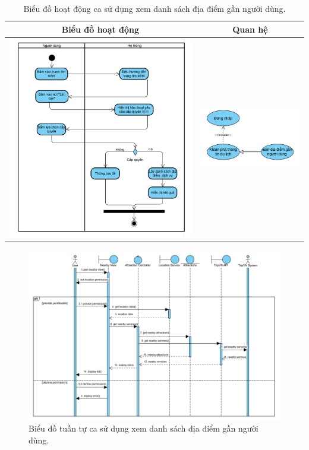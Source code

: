 \begin{table}[H] %
    \centering
    \caption{Biểu đồ hoạt động ca sử dụng xem danh sách địa điểm gần người dùng.} %
    \label{tab:uc_nearby_places_diagrams} %
    \begin{tabular}{| c | c |}
        \hline
        \textbf{Biểu đồ hoạt động} & \textbf{Quan hệ} \\
        \hline
        \includegraphics[width=0.5\linewidth]{figures/c3/3-3-7-ad.png} %
        &
        \includegraphics[width=0.45\linewidth]{figures/c3/3-3-7-rd.png} \\ %
        \hline
    \end{tabular}
\end{table}

\begin{figure}[H]
    \centering
    \includegraphics[width=1\textwidth]{figures/c3/3-3-7-sd.png} %
    \caption{Biểu đồ tuần tự ca sử dụng xem danh sách địa điểm gần người dùng.}
    \label{fig:3-3-7-sequence-diagram}
\end{figure}
